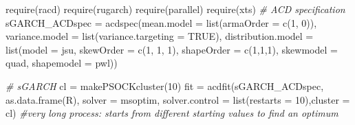 \documentclass[a4paper,nobind]{templates/ociamthesis}
\newenvironment{Shaded}{\begin{snugshade}}{\end{snugshade}}
\newcommand{\AttributeTok}[1]{\textcolor[rgb]{0.77,0.63,0.00}{#1}}
\newcommand{\CommentTok}[1]{\textcolor[rgb]{0.56,0.35,0.01}{\textit{#1}}}
\newcommand{\ConstantTok}[1]{\textcolor[rgb]{0.00,0.00,0.00}{#1}}
\newcommand{\DecValTok}[1]{\textcolor[rgb]{0.00,0.00,0.81}{#1}}
\newcommand{\FunctionTok}[1]{\textcolor[rgb]{0.00,0.00,0.00}{#1}}
\newcommand{\NormalTok}[1]{#1}
\newcommand{\OtherTok}[1]{\textcolor[rgb]{0.56,0.35,0.01}{#1}}
\newcommand{\StringTok}[1]{\textcolor[rgb]{0.31,0.60,0.02}{#1}}
\renewenvironment{Shaded}
{
  \vspace{10pt}%
  \begin{snugshade}%
}{%
  \end{snugshade}%
  \vspace{8pt}%
}
\begin{document}
\begin{Shaded}
\begin{Highlighting}[]
\FunctionTok{require}\NormalTok{(racd)}
\FunctionTok{require}\NormalTok{(rugarch)}
\FunctionTok{require}\NormalTok{(parallel)}
\FunctionTok{require}\NormalTok{(xts)}
\CommentTok{\# ACD specification}
\NormalTok{sGARCH\_ACDspec }\OtherTok{=} \FunctionTok{acdspec}\NormalTok{(}\AttributeTok{mean.model =} \FunctionTok{list}\NormalTok{(}\AttributeTok{armaOrder =} \FunctionTok{c}\NormalTok{(}\DecValTok{1}\NormalTok{, }\DecValTok{0}\NormalTok{)), }\AttributeTok{variance.model =} \FunctionTok{list}\NormalTok{(}\AttributeTok{variance.targeting =} \ConstantTok{TRUE}\NormalTok{),}
\AttributeTok{distribution.model =} \FunctionTok{list}\NormalTok{(}\AttributeTok{model =} \StringTok{\textquotesingle{}jsu\textquotesingle{}}\NormalTok{, }\AttributeTok{skewOrder =} \FunctionTok{c}\NormalTok{(}\DecValTok{1}\NormalTok{, }\DecValTok{1}\NormalTok{, }\DecValTok{1}\NormalTok{), }\AttributeTok{shapeOrder =} \FunctionTok{c}\NormalTok{(}\DecValTok{1}\NormalTok{,}\DecValTok{1}\NormalTok{,}\DecValTok{1}\NormalTok{), }\AttributeTok{skewmodel =} \StringTok{\textquotesingle{}quad\textquotesingle{}}\NormalTok{, }\AttributeTok{shapemodel =} \StringTok{\textquotesingle{}pwl\textquotesingle{}}\NormalTok{))}

\CommentTok{\# sGARCH}
\NormalTok{cl }\OtherTok{=} \FunctionTok{makePSOCKcluster}\NormalTok{(}\DecValTok{10}\NormalTok{)}
\NormalTok{fit }\OtherTok{=} \FunctionTok{acdfit}\NormalTok{(sGARCH\_ACDspec, }\FunctionTok{as.data.frame}\NormalTok{(R), }\AttributeTok{solver =} \StringTok{\textquotesingle{}msoptim\textquotesingle{}}\NormalTok{, }\AttributeTok{solver.control =} \FunctionTok{list}\NormalTok{(}\AttributeTok{restarts =} \DecValTok{10}\NormalTok{),}\AttributeTok{cluster =}\NormalTok{ cl) }\CommentTok{\#very long process: starts from different starting values to find an optimum}
\end{Highlighting}
\end{Shaded}
\end{document}
